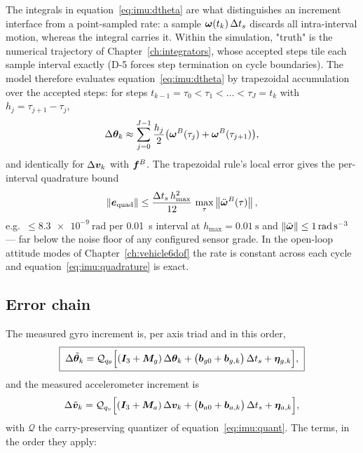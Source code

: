 The integrals in equation~\eqref{eq:imu:dtheta} are what distinguishes an
increment interface from a point-sampled rate: a sample
$\bm{\omega}(t_k)\,\Delta t_s$ discards all intra-interval motion,
whereas the integral carries it. Within the simulation, "truth" is the
numerical trajectory of Chapter~\ref{ch:integrators}, whose accepted
steps tile each sample interval exactly (D-5 forces step termination on
cycle boundaries). The model therefore evaluates
equation~\eqref{eq:imu:dtheta} by trapezoidal accumulation over the
accepted steps: for steps $t_{k-1} = \tau_0 < \tau_1 < \dots < \tau_J =
t_k$ with $h_j = \tau_{j+1} - \tau_j$,
\begin{equation}
  \Delta\bm{\theta}_k \approx \sum_{j=0}^{J-1} \frac{h_j}{2}
    \bigl(\bm{\omega}^{B}(\tau_j) + \bm{\omega}^{B}(\tau_{j+1})\bigr),
  \label{eq:imu:quadrature}
\end{equation}
and identically for $\Delta\bm{v}_k$ with $\bm{f}^{B}$. The trapezoidal
rule's local error gives the per-interval quadrature bound
\begin{equation}
  \left\lVert \bm{e}_{\mathrm{quad}} \right\rVert
    \le \frac{\Delta t_s\, h_{\max}^2}{12}\,
      \max_{\tau}\left\lVert \ddot{\bm{\omega}}^{B}(\tau) \right\rVert,
  \label{eq:imu:quaderr}
\end{equation}
e.g.\ $\le \qty{8.3e-9}{\radian}$ per \qty{0.01}{\second} interval at
$h_{\max} = \qty{0.01}{\second}$ and $\left\lVert \ddot{\bm{\omega}} \right\rVert \le
\qty{1}{\radian\per\second\cubed}$ --- far below the noise floor of any
configured sensor grade. In the open-loop attitude modes of
Chapter~\ref{ch:vehicle6dof} the rate is constant across each cycle and
equation~\eqref{eq:imu:quadrature} is exact.

\subsection{Error chain}
\label{sec:imu:errorchain}

The measured gyro increment is, per axis triad and in this order,
\begin{equation}
  \boxed{\;
  \Delta\tilde{\bm{\theta}}_k
    = \mathcal{Q}_{q_\theta}\Bigl[
      (\bm{I}_3 + \bm{M}_g)\,\Delta\bm{\theta}_k
      + \bigl(\bm{b}_{g0} + \bm{b}_{g,k}\bigr)\,\Delta t_s
      + \bm{\eta}_{g,k} \Bigr],
  \;}
  \label{eq:imu:gyro}
\end{equation}
and the measured accelerometer increment is
\begin{equation}
  \Delta\tilde{\bm{v}}_k
    = \mathcal{Q}_{q_v}\Bigl[
      (\bm{I}_3 + \bm{M}_a)\,\Delta\bm{v}_k
      + \bigl(\bm{b}_{a0} + \bm{b}_{a,k}\bigr)\,\Delta t_s
      + \bm{\eta}_{a,k} \Bigr],
  \label{eq:imu:accel}
\end{equation}
with $\mathcal{Q}$ the carry-preserving quantizer of
equation~\eqref{eq:imu:quant}. The terms, in the order they apply:

